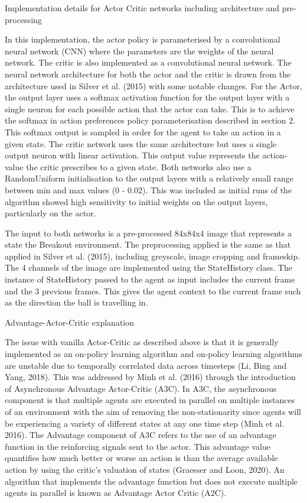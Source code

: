 \documentclass{article}
\begin{document}
Implementation details for Actor Critic networks including architecture and pre-processing

In this implementation, the actor policy is parameterised by a convolutional neural network (CNN) where the parameters are the weights of the neural network. The critic is also implemented as a convolutional neural network. The neural network architecture for both the actor and the critic is drawn from the architecture used in Silver et al. (2015) with some notable changes. For the Actor, the output layer uses a softmax activation function for the output layer with a single neuron for each possible action that the actor can take. This is to achieve the softmax in action preferences policy parameterisation described in section 2. This softmax output is sampled in order for the agent to take an action in a given state. The critic network uses the same architecture but uses a single output neuron with linear activation. This output value represents the action-value the critic prescribes to a given state. Both networks also use a RandomUniform initialisation to the output layers with a relatively small range between min and max values (0 - 0.02). This was included as initial runs of the algorithm showed high sensitivity to initial weights on the output layers, particularly on the actor.

The input to both networks is a pre-processed 84x84x4 image that represents a state the Breakout environment. The preprocessing applied is the same as that applied in Silver et al. (2015), including greyscale, image cropping and frameskip. The 4 channels of the image are implemented using the StateHistory class. The instance of StateHistory passed to the agent as input includes the current frame and the 3 previous frames. This gives the agent context to the current frame such as the direction the ball is travelling in.

Advantage-Actor-Critic explanation

The issue with vanilla Actor-Critic as described above is that it is generally implemented as an on-policy learning algorithm and on-policy learning algorithms are unstable due to temporally correlated data across timesteps (Li, Bing and Yang, 2018). This was addressed by Minh et al. (2016) through the introduction of Asynchronous Advantage Actor-Critic (A3C). In A3C, the asynchronous component is that multiple agents are executed in parallel on multiple instances of an environment with the aim of removing the non-stationarity since agents will be experiencing a variety of different states at any one time step (Minh et al. 2016). The Advantage component of A3C refers to the use of an advantage function in the reinforcing signals sent to the actor. This advantage value quantifies how much better or worse an action is than the average available action by using the critic's valuation of states (Graesser and Loon, 2020). An algorithm that implements the advantage function but does not execute multiple agents in parallel is known as Advantage Actor Critic (A2C).
\end{document}
